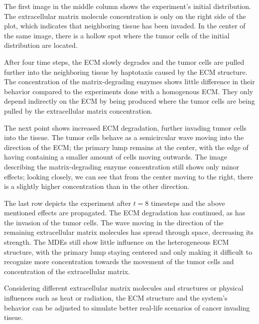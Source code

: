 The first image in the middle column shows the experiment's initial distribution. The extracellular matrix molecule concentration is only on the right side of the plot, which indicates that neighboring tissue has been invaded. In the center of the same image, there is a hollow spot where the tumor cells of the initial distribution are located. 

After four time steps, the ECM slowly degrades and the tumor cells are pulled further into the neighboring tissue by haptotaxis caused by the ECM structure. The concentration of the matrix-degrading enzymes shows little difference in their behavior compared to the experiments done with a homogenous ECM. They only depend indirectly on the ECM by being produced where the tumor cells are being pulled by the extracellular matrix concentration. 

The next point shows increased ECM degradation, further invading tumor cells into the tissue. The tumor cells behave as a semicircular wave moving into the direction of the ECM; the primary lump remains at the center, with the edge of having containing a smaller amount of cells moving outwards. The image describing the matrix-degrading enzyme concentration still shows only minor effects; looking closely, we can see that from the center moving to the right, there is a slightly higher concentration than in the other direction.

The last row depicts the experiment after $t=8$ timesteps and the above mentioned effects are propagated. The ECM degradation has continued, as has the invasion of the tumor cells. The wave moving in the direction of the remaining extracellular matrix molecules has spread through space, decreasing its strength. The MDEs still show little influence on the heterogeneous ECM structure, with the primary lump staying centered and only making it difficult to recognize more concentration towards the movement of the tumor cells and concentration of the extracellular matrix.
 
Considering different extracellular matrix molecules and structures or physical influences such as heat or radiation, the ECM structure and the system's behavior can be adjusted to simulate better real-life scenarios of cancer invading tissue.
